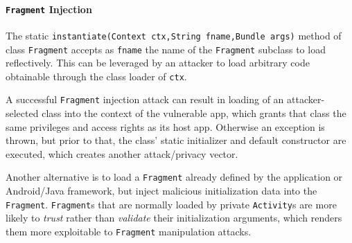 \paragraph{{\tt Fragment} Injection} The static {\tt instantiate(Context ctx,String fname,Bundle args)} method of class {\tt Fragment} accepts as {\tt fname} the name of the {\tt Fragment} subclass to load reflectively. This can be leveraged by an attacker to load arbitrary code obtainable through the class loader of {\tt ctx}. 

A successful {\tt Fragment} injection attack can result in loading of an attacker-selected class into the context of the vulnerable app, which grants that class the same privileges and access rights as its host app.
Otherwise an exception is thrown, but prior to that, the class' static initializer and default constructor are executed, which creates another attack/privacy vector.

Another alternative is to load a {\tt Fragment} already defined by the application or Android/Java framework, but inject malicious initialization data into the {\tt Fragment}. {\tt Fragment}s that are normally loaded by private {\tt Activity}s are more likely to \emph{trust} rather than \emph{validate} their initialization arguments, which renders them more exploitable to {\tt Fragment} manipulation attacks.
%


%



